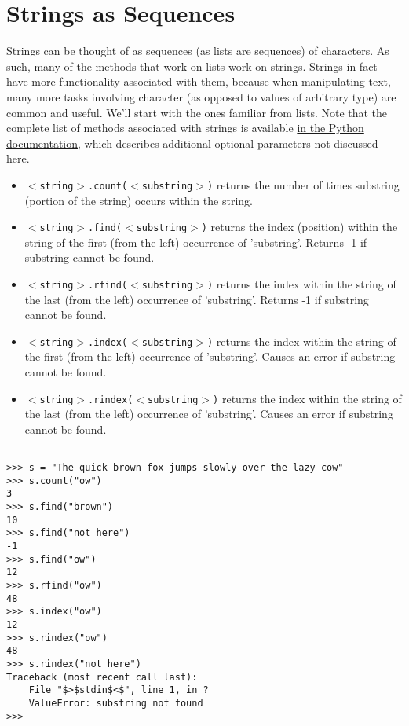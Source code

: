 \section{Strings as Sequences}

Strings can be thought of as sequences (as lists are sequences) of   characters. As such, many of the methods that work on lists work on   strings. Strings in fact have more functionality associated with them,   because when manipulating text, many more tasks   involving character (as opposed to values of arbitrary type) are common   and useful. We'll start with the ones familiar from lists. Note that   the complete list of methods associated with strings is available \href{http://docs.python.org/lib/string-methods.html}{in the Python   documentation}, which describes additional optional parameters not   discussed here.
\begin{itemize}
	\item 
\texttt{$<$string$>$.count($<$substring$>$)} returns    the number of times substring (portion of the string) occurs within the string.
	\item 
\texttt{$<$string$>$.find($<$substring$>$)} returns the    index (position) within the string of the first (from the left) occurrence of    'substring'. Returns -1 if substring cannot be found.
	\item 
\texttt{$<$string$>$.rfind($<$substring$>$)} returns    the index within the string of the last (from the left) occurrence    of 'substring'. Returns -1 if substring cannot be found.
	\item 
\texttt{$<$string$>$.index($<$substring$>$)} returns    the index within the string of the first (from the left) occurrence    of 'substring'. Causes an error if substring cannot be found.
	\item 
\texttt{$<$string$>$.rindex($<$substring$>$)} returns    the index within the string of the last (from the left) occurrence    of 'substring'. Causes an error if substring cannot be found.
\end{itemize}
\begin{lstlisting}

>>> s = "The quick brown fox jumps slowly over the lazy cow"
>>> s.count("ow")
3
>>> s.find("brown")
10
>>> s.find("not here")
-1
>>> s.find("ow")
12
>>> s.rfind("ow")
48
>>> s.index("ow")
12
>>> s.rindex("ow")
48
>>> s.rindex("not here")
Traceback (most recent call last):
    File "$>$stdin$<$", line 1, in ?
    ValueError: substring not found
>>>
\end{lstlisting}


